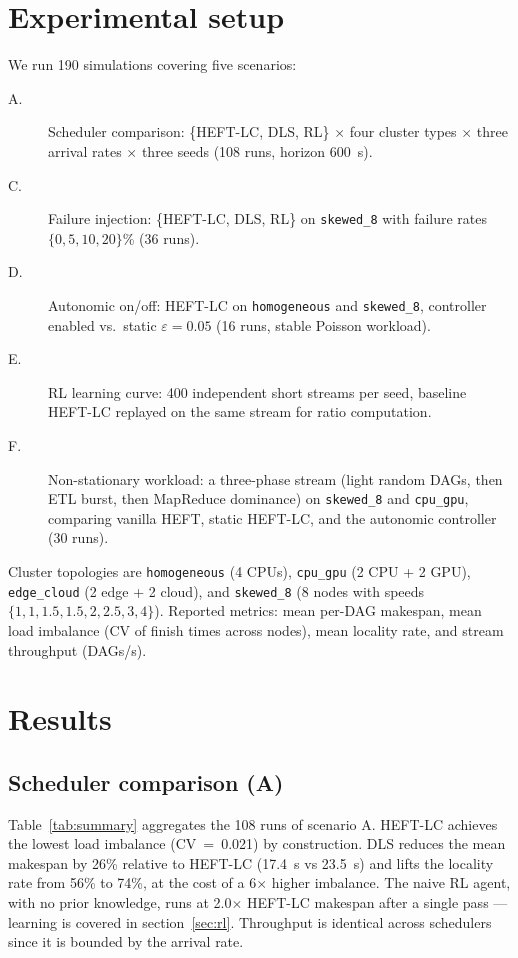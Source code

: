 \documentclass[conference]{IEEEtran}
\begin{document}
\section{Experimental setup}

We run 190 simulations covering five scenarios:
\begin{description}
  \item[A.] Scheduler comparison: \{HEFT-LC, DLS, RL\} \(\times\) four
        cluster types \(\times\) three arrival rates \(\times\) three seeds
        (108 runs, horizon 600~s).
  \item[C.] Failure injection: \{HEFT-LC, DLS, RL\} on \texttt{skewed\_8}
        with failure rates \(\{0, 5, 10, 20\}\)\% (36 runs).
  \item[D.] Autonomic on/off: HEFT-LC on \texttt{homogeneous} and
        \texttt{skewed\_8}, controller enabled vs.\ static \(\varepsilon=0.05\)
        (16 runs, stable Poisson workload).
  \item[E.] RL learning curve: 400 independent short streams per seed,
        baseline HEFT-LC replayed on the same stream for ratio computation.
  \item[F.] Non-stationary workload: a three-phase stream (light random
        DAGs, then ETL burst, then MapReduce dominance) on
        \texttt{skewed\_8} and \texttt{cpu\_gpu}, comparing vanilla HEFT,
        static HEFT-LC, and the autonomic controller (30 runs).
\end{description}
Cluster topologies are \texttt{homogeneous} (4 CPUs), \texttt{cpu\_gpu}
(2 CPU + 2 GPU), \texttt{edge\_cloud} (2 edge + 2 cloud), and
\texttt{skewed\_8} (8 nodes with speeds \(\{1,1,1.5,1.5,2,2.5,3,4\}\)).
Reported metrics: mean per-DAG makespan, mean load imbalance (CV of
finish times across nodes), mean locality rate, and stream throughput
(DAGs/s).

\section{Results}

\subsection{Scheduler comparison (A)}
Table~\ref{tab:summary} aggregates the 108 runs of scenario A.
HEFT-LC achieves the lowest load imbalance (CV~=~0.021) by construction.
DLS reduces the mean makespan by 26\% relative to HEFT-LC (17.4~s vs
23.5~s) and lifts the locality rate from 56\% to 74\%, at the cost of a
6\(\times\) higher imbalance. The naive RL agent, with no prior knowledge,
runs at 2.0\(\times\) HEFT-LC makespan after a single pass --- learning is
covered in section~\ref{sec:rl}. Throughput is identical across
schedulers since it is bounded by the arrival rate.
\end{document}
